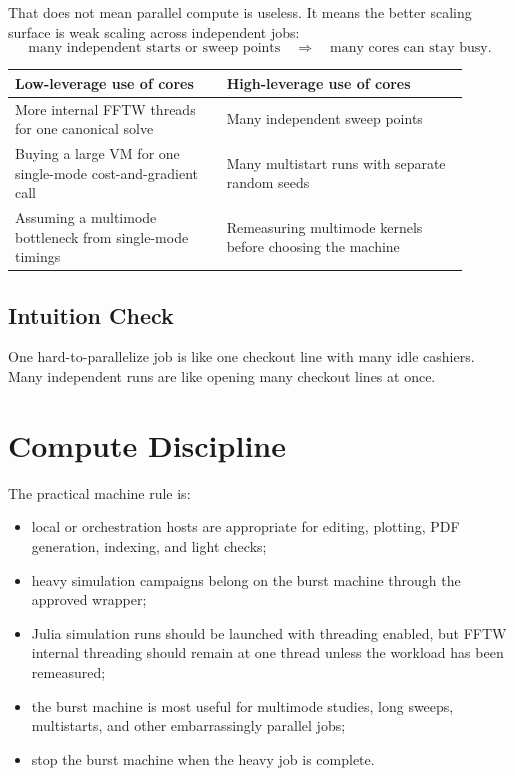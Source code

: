 \documentclass[11pt]{article}
\begin{document}
That does not mean parallel compute is useless. It means the better scaling
surface is weak scaling across independent jobs:
\[
    \text{many independent starts or sweep points}
    \quad \Rightarrow \quad
    \text{many cores can stay busy}.
\]

\begin{center}
\small
\begin{tabular}{>{\raggedright\arraybackslash}p{0.42\linewidth}
                >{\raggedright\arraybackslash}p{0.48\linewidth}}
\toprule
\textbf{Low-leverage use of cores} & \textbf{High-leverage use of cores} \\
\midrule
More internal FFTW threads for one canonical solve &
Many independent sweep points \\
Buying a large VM for one single-mode cost-and-gradient call &
Many multistart runs with separate random seeds \\
Assuming a multimode bottleneck from single-mode timings &
Remeasuring multimode kernels before choosing the machine \\
\bottomrule
\end{tabular}
\end{center}

\subsection*{Intuition Check}

One hard-to-parallelize job is like one checkout line with many idle cashiers.
Many independent runs are like opening many checkout lines at once.

\section{Compute Discipline}

The practical machine rule is:
\begin{itemize}
    \item local or orchestration hosts are appropriate for editing, plotting,
    PDF generation, indexing, and light checks;
    \item heavy simulation campaigns belong on the burst machine through the
    approved wrapper;
    \item Julia simulation runs should be launched with threading enabled, but
    FFTW internal threading should remain at one thread unless the workload has
    been remeasured;
    \item the burst machine is most useful for multimode studies, long sweeps,
    multistarts, and other embarrassingly parallel jobs;
    \item stop the burst machine when the heavy job is complete.
\end{itemize}
\end{document}
